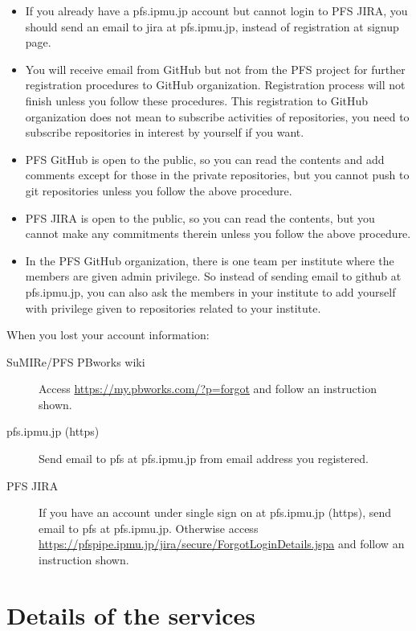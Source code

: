 \documentclass[a4paper,notitlepage]{article}
\begin{document}
\begin{itemize}
  \item If you already have a pfs.ipmu.jp account but cannot login to PFS JIRA, 
    you should send an email to jira at pfs.ipmu.jp, instead of registration 
    at signup page. 
  \item You will receive email from GitHub but not from the PFS project for 
    further registration procedures to GitHub organization. Registration 
    process will not finish unless you follow these procedures. 
    This registration to GitHub organization does not mean to subscribe 
    activities of repositories, you need to subscribe repositories in 
    interest by yourself if you want. 
  \item PFS GitHub is open to the public, so you can read the contents and 
    add comments except for those in the private repositories, but you cannot 
    push to git repositories unless you follow the above procedure.
  \item PFS JIRA is open to the public, so you can read the contents, but 
    you cannot make any commitments therein unless you follow the above 
    procedure.
  \item In the PFS GitHub organization, there is one team per institute where 
    the members are given admin privilege. So instead of sending email to 
    github at pfs.ipmu.jp, you can also ask the members in your institute 
    to add yourself with privilege given to repositories related to your 
    institute. 
\end{itemize}

When you lost your account information: 

\begin{description}
  \item[SuMIRe/PFS PBworks wiki] 
    Access \url{https://my.pbworks.com/?p=forgot} and follow an instruction 
    shown.
  \item[pfs.ipmu.jp (https)]
    Send email to pfs at pfs.ipmu.jp from email address you registered.
  \item[PFS JIRA]
    If you have an account under single sign on at pfs.ipmu.jp (https), 
    send email to pfs at pfs.ipmu.jp. Otherwise access 
    \url{https://pfspipe.ipmu.jp/jira/secure/ForgotLoginDetails.jspa} 
    and follow an instruction shown. 
\end{description}


\section{Details of the services}
\end{document}
